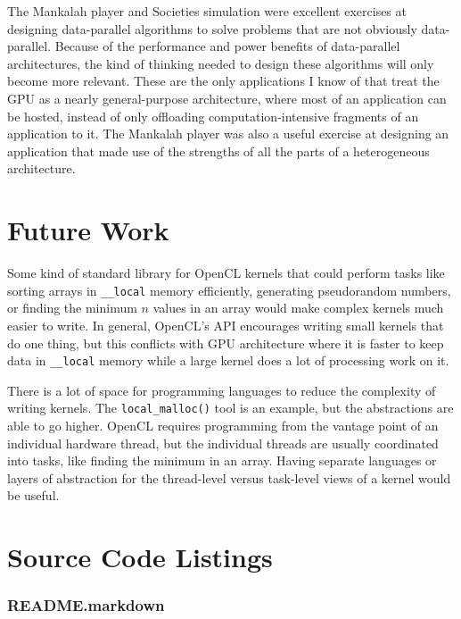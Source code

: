 \documentclass{article}
\begin{document}
The Mankalah player and Societies simulation were excellent exercises at designing data-parallel algorithms to solve problems that are not obviously data-parallel. Because of the performance and power benefits of data-parallel architectures, the kind of thinking needed to design these algorithms will only become more relevant. These are the only applications I know of that treat the GPU as a nearly general-purpose architecture, where most of an application can be hosted, instead of only offloading computation-intensive fragments of an application to it. The Mankalah player was also a useful exercise at designing an application that made use of the strengths of all the parts of a heterogeneous architecture. 

\section{Future Work}
Some kind of standard library for OpenCL kernels that could perform tasks like sorting arrays in \texttt{\_\_local} memory efficiently, generating pseudorandom numbers, or finding the minimum $n$ values in an array would make complex kernels much easier to write. In general, OpenCL's API encourages writing small kernels that do one thing, but this conflicts with GPU architecture where it is faster to keep data in \texttt{\_\_local} memory while a large kernel does a lot of processing work on it.

There is a lot of space for programming languages to reduce the complexity of writing kernels. The \texttt{local\_malloc()} tool is an example, but the abstractions are able to go higher. OpenCL requires programming from the vantage point of an individual hardware thread, but the individual threads are usually coordinated into tasks, like finding the minimum in an array. Having separate languages or layers of abstraction for the thread-level versus task-level views of a kernel would be useful.




\appendix
\section{Source Code Listings}

\subsubsection*{README.markdown}

\end{document}
